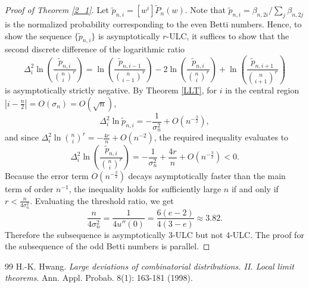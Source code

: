 \documentclass[10pt,a4paper]{amsart}
\begin{document}
\begin{proof}[Proof of Theorem \ref{2_1}]
  Let $\tilde{p}_{n,i}= [w^i]\tilde{P}_n(w) $. Note that $\tilde{p}_{n,i}= \beta_{n,2i} / \sum_j \beta_{n,2j}$ is the normalized probability corresponding to the even Betti numbers. Hence, to show the sequence $\{\tilde{p}_{n,i}\}$ is asymptotically $r$-ULC, it suffices to show that the second discrete difference of the logarithmic ratio
  \[\Delta^2_i \ln \left(\frac{\tilde{p}_{n,i}}{\binom{n}{i}^r}\right) =\ln \left(\frac{\tilde{p}_{n,i-1}}{\binom{n}{i-1}^r}\right)-2 \ln \left(\frac{\tilde{p}_{n,i}}{\binom{n}{i}^r}\right)+\ln \left(\frac{\tilde{p}_{n,i+1}}{\binom{n}{i+1}^r}\right) \]
  is asymptotically strictly negative.
  By Theorem \ref{LLT}, for $i$ in the central region $|i - \frac{n}{2}|=O(\sigma_n)=O(\sqrt{n})$,
  \[ \Delta^2_i \ln \tilde{p}_{n,i} = - \frac{1}{\sigma_n^2}+ O\left( n^{-\frac{3}{2}}\right), \]
  and since $\Delta^2_i \ln {\binom{n}{i}^r}= - \frac{4r}{n}+ O\left( n^{-2}\right)$, the required inequality evaluates to
  \[\Delta^2_i \ln \left(\frac{\tilde{p}_{n,i}}{\binom{n}{i}^r}\right) = - \frac{1}{\sigma_n^2}+\frac{4r}{n}+O\left( n^{-\frac{3}{2}}\right)<0.\]
  Because the error term $O\left( n^{-\frac{3}{2}}\right)$ decays asymptotically faster than the main term of order $n^{-1}$, the inequality holds for sufficiently large $n$ if and only if $r< \frac{n}{4\sigma_n^2}$. Evaluating the threshold ratio, we get
  \[ \frac{n}{4\sigma_n^2} = \frac{1}{4 u''(0)}= \frac{6(e-2)}{4 (3-e)}\approx 3.82. \]
  Therefore the subsequence is asymptotically 3-ULC but not 4-ULC. The proof for the subsequence of the odd Betti numbers is parallel.
\end{proof}

\begin{thebibliography}{99}
 H.-K. Hwang. {\em Large deviations of combinatorial distributions. II. Local limit theorems}. Ann. Appl. Probab. 8(1): 163-181 (1998).
\end{thebibliography}
\end{document}
